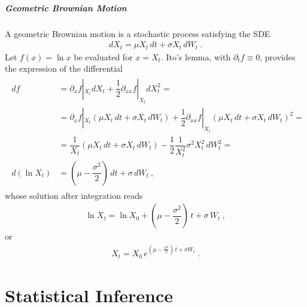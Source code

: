 \documentclass[letterpaper,10pt,english]{jupyterBook}
\begin{document}
\subsubsection{Geometric Brownian Motion}
\label{\detokenize{ch/prob/processes-calculus:geometric-brownian-motion}}
\sphinxAtStartPar
A geometric Brownian motion is a stochastic process satisfying the SDE
\begin{equation*}
\begin{split}d X_t = \mu X_t \, dt + \sigma X_t \, dW_t \ .\end{split}
\end{equation*}
\sphinxAtStartPar
Let \(f(x) = \ln x\) be evaluated for \(x = X_t\). Ito’s lemma, with \(\partial_t f \equiv 0\), provides the expression of the differential
\begin{equation*}
\begin{split}\begin{aligned}
  d f
  & = \partial_x f|_{X_t} d X_t + \dfrac{1}{2} \partial_{xx} f|_{X_t} d X_t^2 = \\
  & = \partial_x f|_{X_t} \left( \mu X_t \, dt + \sigma X_t \, dW_t \right) + \dfrac{1}{2} \partial_{xx} f|_{X_t}  \left( \mu X_t \, dt + \sigma X_t \, dW_t \right)^2 = \\
  & = \dfrac{1}{X_t} \left( \mu X_t \, dt + \sigma X_t \, dW_t \right) - \dfrac{1}{2} \dfrac{1}{X_t^2} \sigma^2 X^2_t \, dW^2_t = \\
  d \left( \ln X_t \right) & = \left( \mu - \dfrac{\sigma^2}{2} \right) \, dt + \sigma \, dW_t \ ,
\end{aligned}\end{split}
\end{equation*}
\sphinxAtStartPar
whose solution after integration reads
\begin{equation*}
\begin{split}\ln X_t = \ln X_0 + \left( \mu - \dfrac{\sigma^2}{2} \right) \, t + \sigma \, W_t \ ,\end{split}
\end{equation*}
\sphinxAtStartPar
or
\begin{equation*}
\begin{split}X_t = X_0 \, e^{\left( \mu - \frac{\sigma^2}{2} \right) \, t + \sigma W_t} \ .\end{split}
\end{equation*}
\sphinxstepscope


\part{Statistical Inference}
\end{document}
